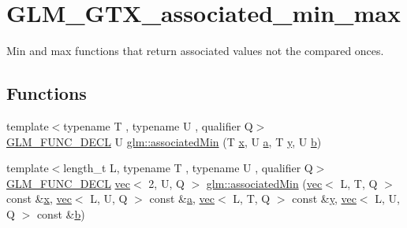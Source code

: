 \hypertarget{group__gtx__associated__min__max}{}\section{G\+L\+M\+\_\+\+G\+T\+X\+\_\+associated\+\_\+min\+\_\+max}
\label{group__gtx__associated__min__max}


Min and max functions that return associated values not the compared onces.  


\subsection*{Functions}
\begin{DoxyCompactItemize}
\item 
{\footnotesize template$<$typename T , typename U , qualifier Q$>$ }\\\mbox{\hyperlink{setup_8hpp_ab2d052de21a70539923e9bcbf6e83a51}{G\+L\+M\+\_\+\+F\+U\+N\+C\+\_\+\+D\+E\+CL}} U \mbox{\hyperlink{group__gtx__associated__min__max_gacc01bd272359572fc28437ae214a02df}{glm\+::associated\+Min}} (T \mbox{\hyperlink{_s_d_l__opengl_8h_ad0e63d0edcdbd3d79554076bf309fd47}{x}}, U \mbox{\hyperlink{_s_d_l__opengl__glext_8h_a3309789fc188587d666cda5ece79cf82}{a}}, T \mbox{\hyperlink{_s_d_l__opengl_8h_a1675d9d7bb68e1657ff028643b4037e3}{y}}, U \mbox{\hyperlink{_s_d_l__opengl__glext_8h_a0f71581a41fd2264c8944126dabbd010}{b}})
\item 
{\footnotesize template$<$length\+\_\+t L, typename T , typename U , qualifier Q$>$ }\\\mbox{\hyperlink{setup_8hpp_ab2d052de21a70539923e9bcbf6e83a51}{G\+L\+M\+\_\+\+F\+U\+N\+C\+\_\+\+D\+E\+CL}} \mbox{\hyperlink{structglm_1_1vec}{vec}}$<$ 2, U, Q $>$ \mbox{\hyperlink{group__gtx__associated__min__max_gac2f0dff90948f2e44386a5eafd941d1c}{glm\+::associated\+Min}} (\mbox{\hyperlink{structglm_1_1vec}{vec}}$<$ L, T, Q $>$ const \&\mbox{\hyperlink{_s_d_l__opengl_8h_ad0e63d0edcdbd3d79554076bf309fd47}{x}}, \mbox{\hyperlink{structglm_1_1vec}{vec}}$<$ L, U, Q $>$ const \&\mbox{\hyperlink{_s_d_l__opengl__glext_8h_a3309789fc188587d666cda5ece79cf82}{a}}, \mbox{\hyperlink{structglm_1_1vec}{vec}}$<$ L, T, Q $>$ const \&\mbox{\hyperlink{_s_d_l__opengl_8h_a1675d9d7bb68e1657ff028643b4037e3}{y}}, \mbox{\hyperlink{structglm_1_1vec}{vec}}$<$ L, U, Q $>$ const \&\mbox{\hyperlink{_s_d_l__opengl__glext_8h_a0f71581a41fd2264c8944126dabbd010}{b}})
\item 

\end{DoxyCompactItemize}
